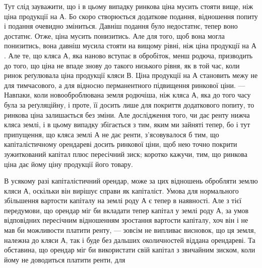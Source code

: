 Тут слід зауважити, що і в цьому випадку ринкова ціна мусить стояти
вище, ніж ціна продукції на $А$. Бо скоро створюється додаткове подання, відношення
попиту і подання очевидно зміниться. Давніш подання було недостатнє,
тепер воно достатнє. Отже, ціна мусить понизитись. Але для того, щоб вона могла
понизитись, вона давніш мусила стояти на вищому рівні, ніж ціна продукції на $А$.
Але те, що кляса $А$, яка наново вступає в обробіток, менш родюча, призводить до
того, що ціна не впаде знову до такого низького рівня, як в той час, коли ринок
реґулювала ціна продукції кляси $В$. Ціна продукції на $А$ становить межу не для
тимчасового, а для відносно перманентного підвищення ринкової ціни. — Навпаки,
коли новооброблювана земля родючіша, ніж кляса $А$, яка до того часу була за
реґуляційну, і проте, її досить лише для покриття додаткового попиту, то ринкова
ціна залишається без зміни. Але дослідження того, чи дає ренту нижча
кляса землі, і в цьому випадку збігається з тим, яким ми зайняті тепер, бо
і тут припущення, що кляса землі $А$ не дає ренти, з’ясовувалося б тим, що
капіталістичному орендареві досить ринкової ціни, щоб нею точно покрити
зужиткований капітал плюс пересічний зиск; коротко кажучи, тим, що ринкова
ціна дає йому ціну продукції його товару.

В усякому разі капіталістичний орендар, може за цих відношень обробляти
землю кляси $А$, оскільки він вирішує справи як капіталіст. Умова для
нормального збільшення вартости капіталу на землі роду $А$ є тепер в наявності.
Але з тієї передумови, що орендар міг би вкладати тепер капітал у землі
роду $А$, за умов відповідних пересічним відношенням зростання вартости капіталу,
хоч він і не мав би можливости платити ренту, — зовсім не випливає
висновок, що ця земля, належна до кляси $А$, так і буде без дальших околичностей
віддана орендареві. Та обставина, що орендар міг би використати свій
капітал з звичайним зиском, коли йому не доводиться платити ренти, для
\parbreak{}  %
